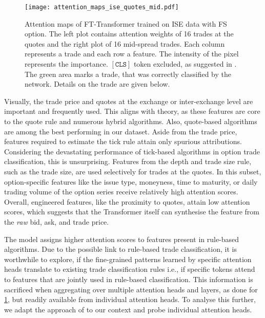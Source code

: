 \begin{figure}[h!]
    \centering
    \texttt{[image: attention\_maps\_ise\_quotes\_mid.pdf]}
    \caption[Attention Maps of FT-Transformer]{Attention maps of FT-Transformer trained on \gls{ISE} data with \gls{FS} option. The left plot contains attention weights of \num{16} trades at the quotes and the right plot of \num{16} mid-spread trades. Each column represents a trade and each row a feature. The intensity of the pixel represents the importance. $\mathtt{[CLS]}$ token excluded, as suggested in \textcite[][4]{cheferGenericAttentionmodelExplainability2021}. The green area marks a trade, that was correctly classified by the network. Details on the trade are given below.}
    \label{fig:attention-maps-ise}
\end{figure}

Visually, the trade price and quotes at the exchange or inter-exchange level are important and frequently used. This aligns with theory, as these features are core to the quote rule and numerous hybrid algorithms. Also, quote-based algorithms are among the best performing in our dataset. Aside from the trade price, features required to estimate the tick rule attain only spurious attributions. Considering the devastating performance of tick-based algorithms in option trade classification, this is unsurprising. Features from the depth and trade size rule, such as the trade size, are used selectively for trades at the quotes. In this subset, option-specific features like the issue type, moneyness, time to maturity, or daily trading volume of the option series receive relatively high attention scores.  Overall, engineered features, like the proximity to quotes, attain low attention scores, which suggests that the Transformer itself can synthesise the feature from the \emph{raw} bid, ask, and trade price.

The model assigns higher attention scores to features present in rule-based algorithms. Due to the possible link to rule-based trade classification, it is worthwhile to explore, if the fine-grained patterns learned by specific attention heads translate to existing trade classification rules i.e., if specific tokens attend to features that are jointly used in rule-based classification. This information is sacrificed when aggregating over multiple attention heads and layers, as done for \cref{fig:attention-maps-ise}, but readily available from individual attention heads. To analyse this further, we adapt the approach of \textcite[][4]{clarkWhatDoesBERT2019} to our context and probe individual attention heads.

